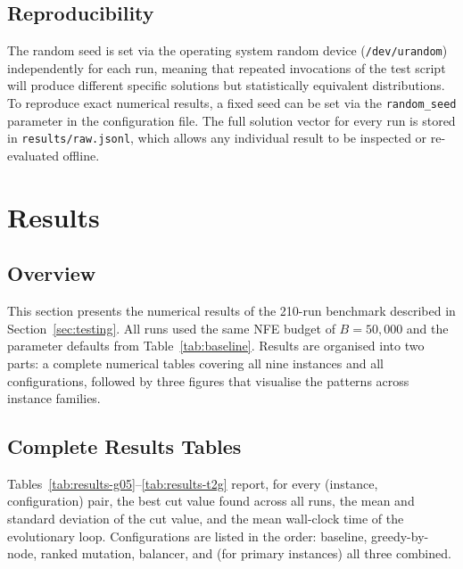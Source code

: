 \documentclass[12pt]{article}
\begin{document}
\subsection{Reproducibility}

The random seed is set via the operating system random device (\texttt{/dev/urandom})
independently for each run, meaning that repeated invocations of the test script
will produce different specific solutions but statistically equivalent distributions.
To reproduce exact numerical results, a fixed seed can be set via the
\texttt{random\_seed} parameter in the configuration file.
The full solution vector for every run is stored in \texttt{results/raw.jsonl},
which allows any individual result to be inspected or re-evaluated offline.

\section{Results}
\label{sec:results}

\subsection{Overview}

This section presents the numerical results of the 210-run benchmark described
in Section~\ref{sec:testing}.
All runs used the same NFE budget of $B = 50{,}000$ and the parameter defaults
from Table~\ref{tab:baseline}.
Results are organised into two parts: a complete numerical tables covering all
nine instances and all configurations, followed by three figures that visualise
the patterns across instance families.

\subsection{Complete Results Tables}

Tables~\ref{tab:results-g05}--\ref{tab:results-t2g} report, for every
(instance, configuration) pair, the best cut value found across all runs, the
mean and standard deviation of the cut value, and the mean wall-clock time of
the evolutionary loop.
Configurations are listed in the order: baseline, greedy-by-node, ranked
mutation, balancer, and (for primary instances) all three combined.
\end{document}
